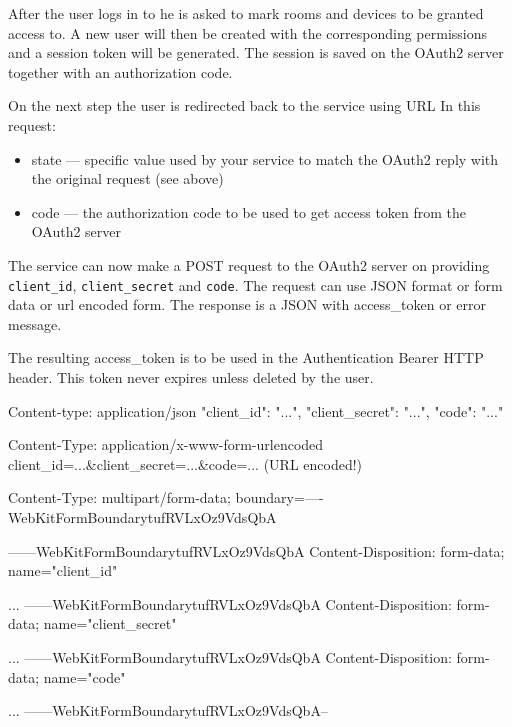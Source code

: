 After the user logs in to \zway he is asked to mark rooms and devices to be granted access to.
A new user will then be created with the corresponding permissions and a session token will be generated.
The session is saved on the \zwaveme OAuth2 server together with an authorization code.

On the next step the user is redirected back to the service using URL 
In this request:
\begin{itemize}
\item state --- specific value used by your service to match the OAuth2 reply with the original request (see above)
\item code --- the authorization code to be used to get access token from the OAuth2 server
\end{itemize}

The service can now make a POST request to the \zwaveme OAuth2 server on  providing \texttt{client\_id}, \texttt{client\_secret} and \texttt{code}.
The request can use JSON format or form data or url encoded form. The response is a JSON with access\_token or error message.

The resulting access\_token is to be used in the Authentication Bearer HTTP header.
This token never expires unless deleted by the user.

\begin{listingverbatim}
Content-type: application/json
{
    "client_id": "...",
    "client_secret": "...",
    "code": "..."
}
\end{listingverbatim}

\begin{listingverbatim}
Content-Type: application/x-www-form-urlencoded
client_id=...&client_secret=...&code=... (URL encoded!)
\end{listingverbatim}

\begin{listingverbatim}
Content-Type: multipart/form-data; boundary=----WebKitFormBoundarytufRVLxOz9VdsQbA

------WebKitFormBoundarytufRVLxOz9VdsQbA
Content-Disposition: form-data; name="client_id"

...
------WebKitFormBoundarytufRVLxOz9VdsQbA
Content-Disposition: form-data; name="client_secret"

...
------WebKitFormBoundarytufRVLxOz9VdsQbA
Content-Disposition: form-data; name="code"

...
------WebKitFormBoundarytufRVLxOz9VdsQbA--
\end{listingverbatim}

